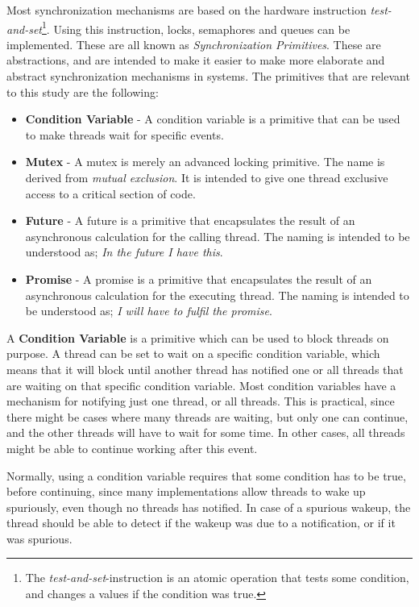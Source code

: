 \documentclass[a4paper]{article}
\begin{document}
Most synchronization mechanisms are based on the hardware instruction \textit{test-and-set}\footnote{The \textit{test-and-set}-instruction is an atomic operation that tests some condition, and changes a values if the condition was true.}. Using this instruction, locks, semaphores and queues can be implemented. These are all known as \textit{Synchronization Primitives}. These are abstractions, and are intended to make it easier to make more elaborate and abstract synchronization mechanisms in systems. The primitives that are relevant to this study are the following:

\begin{itemize}
\item \textbf{Condition Variable} - A condition variable is a primitive that can be used to make threads wait for specific events.
\item \textbf{Mutex} - A mutex is merely an advanced locking primitive. The name is derived from \textit{mutual exclusion}. It is intended to give one thread exclusive access to a critical section of code.
\item \textbf{Future} - A future is a primitive that encapsulates the result of an asynchronous calculation for the calling thread. The naming is intended to be understood as; \textit{In the future I have this}.
\item \textbf{Promise} - A promise is a primitive that encapsulates the result of an asynchronous calculation for the executing thread. The naming is intended to be understood as; \textit{I will have to fulfil the promise}.
\end{itemize}


A \textbf{Condition Variable} is a primitive which can be used to block threads on purpose. A thread can be set to wait on a specific condition variable, which means that it will block until another thread has notified one or all threads that are waiting on that specific condition variable. Most condition variables have a mechanism for notifying just one thread, or all threads. This is practical, since there might be cases where many threads are waiting, but only one can continue, and the other threads will have to wait for some time. In other cases, all threads might be able to continue working after this event. 

Normally, using a condition variable requires that some condition has to be true, before continuing, since many implementations allow threads to wake up spuriously, even though no threads has notified. In case of a spurious wakeup, the thread should be able to detect if the wakeup was due to a notification, or if it was spurious.\\
\end{document}
